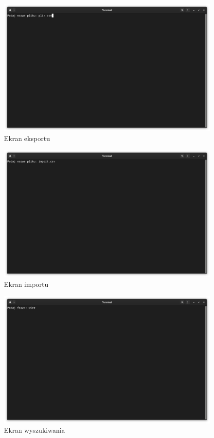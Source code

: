 \documentclass[12pt,a4paper]{article}
\begin{document}
\begin{figure}[hp]
\centering

\includegraphics[scale=.30]{figures/ekran_eksportu.png}

\caption{Ekran eksportu}
\end{figure}

\begin{figure}[hp]
\centering

\includegraphics[scale=.30]{figures/ekran_importu.png}

\caption{Ekran importu}
\end{figure}

\begin{figure}[hp]
\centering

\includegraphics[scale=.30]{figures/ekran_wyszukiwania.png}

\caption{Ekran wyszukiwania}
\end{figure}
\end{document}
